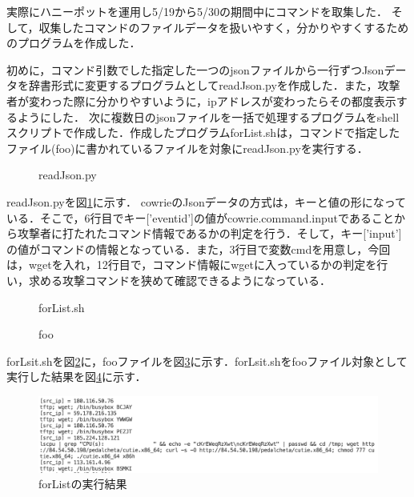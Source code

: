 \documentclass[dvipdfmx]{bta}
\begin{document}
実際にハニーポットを運用し5/19から5/30の期間中にコマンドを取集した．
そして，収集したコマンドのファイルデータを扱いやすく，分かりやすくするためのプログラムを作成した．

初めに，コマンド引数でした指定した一つのjsonファイルから一行ずつJsonデータを辞書形式に変更するプログラムとしてreadJson.pyを作成した．また，攻撃者が変わった際に分かりやすいように，ipアドレスが変わったらその都度表示するようにした．
次に複数日のjsonファイルを一括で処理するプログラムをshellスクリプトで作成した．作成したプログラムforList.shは，コマンドで指定したファイル(foo)に書かれているファイルを対象にreadJson.pyを実行する．

\begin{figure}[htbp]

	
	\caption{readJson.py}\label{fig:readJson.py}
	
\end{figure}

readJson.pyを図\ref{fig:readJson.py}に示す．
cowrieのJsonデータの方式は，キーと値の形になっている．そこで，6行目でキー['eventid']の値がcowrie.command.inputであることから攻撃者に打たれたコマンド情報であるかの判定を行う．そして，キー['input']の値がコマンドの情報となっている．また，3行目で変数cmdを用意し，今回は，wgetを入れ，12行目で，コマンド情報にwgetに入っているかの判定を行い，求める攻撃コマンドを狭めて確認できるようになっている．

\begin{figure}[htbp]

	
	\caption{forList.sh}\label{fig:forList.sh}
	
\end{figure}

\begin{figure}[htbp]

	
	\caption{foo}\label{fig:foo}
	
\end{figure}

forLsit.shを図\ref{fig:forList.sh}に，fooファイルを図\ref{fig:foo}に示す．forLsit.shをfooファイル対象として実行した結果を図\ref{fig:forresult}に示す．
\begin{figure}[htbp]

	\centering
 	\includegraphics[scale=0.7]{forresult.png}
	\caption{forListの実行結果}\label{fig:forresult}
	
\end{figure}
\end{document}
